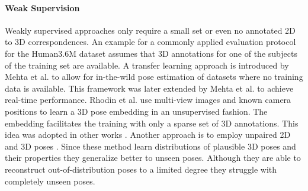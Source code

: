 \documentclass[final]{cvpr}
\begin{document}
\paragraph{Weak Supervision}
Weakly supervised approaches only require a small set or even no annotated 2D to 3D correspondences.
An example for a commonly applied evaluation protocol for the Human3.6M dataset assumes that 3D annotations for one of the subjects of the training set are available.
A transfer learning approach is introduced by Mehta et al. \cite{mpii3Dhp2017} to allow for in-the-wild pose estimation of datasets where no training data is available.
This framework was later extended by Mehta et al. \cite{VNect_SIGGRAPH2017} to achieve real-time performance.
Rhodin et al. \cite{rhodin2018learning} use multi-view images and known camera positions to learn a 3D pose embedding in an unsupervised fashion.
The embedding facilitates the training with only a sparse set of 3D annotations.
This idea was adopted in other works \cite{rhodin2019neural,Unsup3DPose}.
Another approach is to employ unpaired 2D and 3D poses \cite{WanRos2019a,Wang_2019_ICCV,Kundu_2020_CVPR,zanfir20normalizing,chen20garnet,habekost20learning}.
Since these method learn distributions of plausible 3D poses and their properties they generalize better to unseen poses.
Although they are able to reconstruct out-of-distribution poses to a limited degree they struggle with completely unseen poses.
\end{document}
